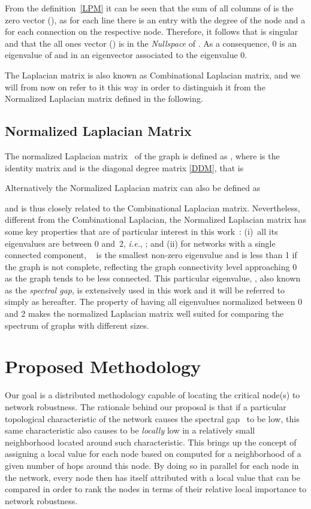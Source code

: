 \documentclass[conference,fleqn]{IEEEtran}
\begin{document}
From the definition~\eqref{LPM} it can be seen that the sum of all columns of  
is the zero vector (), as for each line there is an entry with the degree of the node 
and a  for each connection on the respective node. Therefore, it follows that  is 
singular and that the all ones vector () is in the \textit{Nullspace} of .
As a consequence, 0 is an eigenvalue of  and  in an eigenvector 
associated to the eigenvalue 0.



The Laplacian matrix is also known as Combinational Laplacian matrix, and we will from now on refer to it 
this way in order to distinguish it from the Normalized Laplacian matrix defined in the following.

\subsection{Normalized Laplacian Matrix}
\label{subsec:NormLap}
The normalized Laplacian matrix~\cite{Chung1996} of the graph  
is defined as ,
where  is the identity matrix and  is the diagonal degree matrix \eqref{DDM}, that is



Alternatively the Normalized Laplacian matrix can also be defined as 
 
and is thus closely related to the Combinational Laplacian matrix.
Nevertheless, different from the Combinational Laplacian, the Normalized Laplacian matrix  
has some key properties that are of particular interest in this work~\cite{Mohar1991,Chung1997,Spielman2010}:
(i)~all its eigenvalues are between 0 and~2, \textit{i.e.}, ; 
and (ii) for networks with a single connected component, ~ is the 
smallest non-zero eigenvalue and is less than 1 if the graph is not complete, reflecting the graph 
connectivity level approaching 0 as the graph tends to be less connected.  
This particular eigenvalue, , also known as the \emph{spectral gap}, is extensively 
used in this work and it will be referred to simply as  hereafter. 
The property of having all eigenvalues normalized between 0 and 2 makes the normalized Laplacian matrix well suited for comparing the
spectrum of graphs with different sizes.

\section{Proposed Methodology}
\label{sec:Des}

Our goal is a distributed methodology capable of locating the critical node(s) to network robustness.
The rationale behind our proposal is that if a particular topological characteristic of the network causes the spectral gap~ to be 
low, this same characteristic also causes  to be \emph{locally} low in a relatively small neighborhood 
located around such characteristic. This brings up the concept of assigning a local value for each node based on  computed for a 
neighborhood of a given number  of hops around this node. By doing so in parallel for each node in the network,
every node then has itself attributed with a local value that can be compared in
order to rank the nodes in terms of their relative local importance to network robustness.
\end{document}
